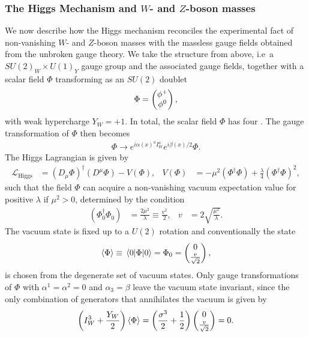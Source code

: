 \subsubsection{The Higgs Mechanism and $W$- and $Z$-boson masses}
\label{sec:gwshiggs}
We now describe how the Higgs mechanism reconciles the experimental fact of
non-vanishing $W$- and $Z$-boson masses with the massless gauge fields
obtained from the unbroken gauge theory. We take the structure from
above, i.e~a $SU(2)_W\times U(1)_Y$ gauge group and the associated
gauge fields, together
with a scalar field $\Phi$ transforming as an $SU(2)$ doublet
\begin{align}
  \Phi = \pmqty{\phi^+ \\ \phi^0},
\end{align}
 with weak hypercharge $Y_W=+1$. In total,
the scalar field $\Phi$ has four \dof. The gauge
transformation of $\Phi$ then becomes
\begin{align}
\Phi \rightarrow e^{i\alpha(x)^a I^a_W}e^{i\beta(x)/2}\Phi.  
\end{align}
The Higgs Lagrangian is given by
\begin{align}\label{eq:higgslag}
  \mathcal{L}_{\text{Higgs}} &= (D_\mu \Phi)^\dagger(D^\mu
  \Phi)-V(\Phi), & V(\Phi)&=-\mu^2(\Phi^\dagger\Phi)+\frac{\lambda}{4}(\Phi^\dagger\Phi)^2,
\end{align}
such that the field $\Phi$ can acquire a non-vanishing vacuum
expectation value for positive $\lambda$ if $\mu^2>0$, determined by
the condition
\begin{align}
  (\Phi^\dagger_0\Phi_0^{\phantom{\dagger}})&=\frac{2\mu^2}{\lambda}\equiv
  \frac{v^2}{2},& v&=2\sqrt{\frac{\mu^2}{\lambda}}.
\end{align}
The vacuum
state is fixed up to a $U(2)$ rotation and conventionally the state 
\begin{align}
\expval{\Phi}\equiv\expval{\Phi}{0}=\Phi_0 = \pmqty{0\\\frac{v}{\sqrt{2}}},
\end{align}
is chosen from the degenerate set of vacuum states. Only gauge transformations of $\Phi$ with $\alpha^1 = \alpha^2 =0$ and
$\alpha_3=\beta$ leave the vacuum state invariant, since the only
combination of generators that annihilates the vacuum is given by
\begin{align}\label{eq:gmnrel}
   \left(I^3_W+\frac{Y_W}{2}\right)\expval{\Phi} = \left(\frac{\sigma^3}{2}+\frac{1}{2}\right) \pmqty{0\\\frac{v}{\sqrt{2}}}=0.
\end{align}
